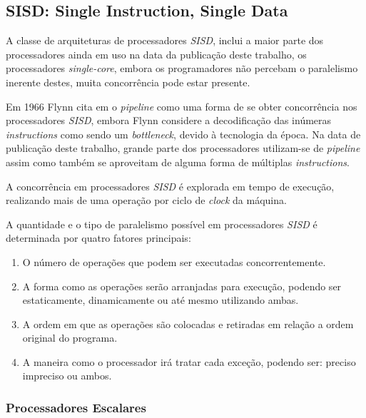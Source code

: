 \subsection{SISD: Single Instruction, Single Data}

A classe de arquiteturas de processadores \textit{SISD}, inclui a 
maior parte dos processadores ainda em uso na data da publicação deste trabalho, 
os processadores 
\textit{single-core}, embora os programadores não percebam o paralelismo 
inerente destes, muita concorrência pode estar presente.  

Em 1966 Flynn cita em \cite{Flynn:1996} o \textit{pipeline} como uma forma de 
se obter concorrência 
nos processadores \textit{SISD}, embora Flynn considere a decodificação das 
inúmeras \textit{instructions} como sendo um \textit{bottleneck}, devido à 
tecnologia da época. 
Na data de publicação deste trabalho, grande parte dos processadores 
utilizam-se de \textit{pipeline} assim como também se aproveitam de alguma forma 
de múltiplas \textit{instructions}.

A concorrência em processadores \textit{SISD} é explorada em tempo de execução,
realizando mais de uma operação por ciclo de \textit{clock} da máquina.

A quantidade e o tipo de paralelismo possível em processadores \textit{SISD}
é determinada por quatro fatores principais:

\begin{enumerate}
        \item O número de operações que podem ser executadas concorrentemente.
        \item A forma como as operações serão arranjadas para execução,
                podendo ser estaticamente, dinamicamente ou até mesmo utilizando
                ambas.
        \item A ordem em que as operações são colocadas e retiradas em relação
                a ordem original do programa.
        \item A maneira como o processador irá tratar cada exceção, podendo ser: 
                preciso impreciso ou ambos.
\end{enumerate}

\subsubsection{Processadores Escalares}

